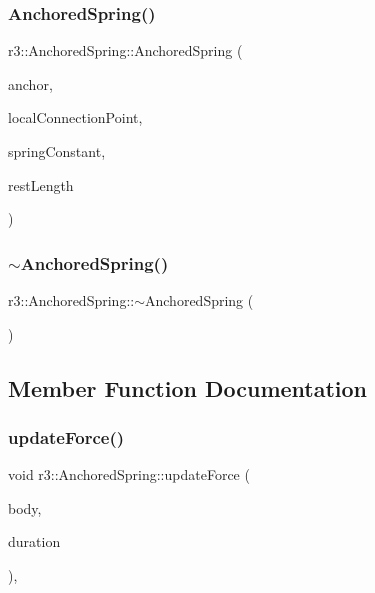 \subsubsection{\texorpdfstring{Anchored\+Spring()}{AnchoredSpring()}}
{\footnotesize\ttfamily r3\+::\+Anchored\+Spring\+::\+Anchored\+Spring (\begin{DoxyParamCaption}\item[{const glm\+::vec3 \&}]{anchor,  }\item[{const glm\+::vec3 \&}]{local\+Connection\+Point,  }\item[{\mbox{\hyperlink{namespacer3_ab2016b3e3f743fb735afce242f0dc1eb}{real}}}]{spring\+Constant,  }\item[{\mbox{\hyperlink{namespacer3_ab2016b3e3f743fb735afce242f0dc1eb}{real}}}]{rest\+Length }\end{DoxyParamCaption})\hspace{0.3cm}{\ttfamily [explicit]}}

\mbox{\label{classr3_1_1_anchored_spring_afe612722d8ed0d7a6f0058dcc21eb17f}} 
\subsubsection{\texorpdfstring{$\sim$\+Anchored\+Spring()}{~AnchoredSpring()}}
{\footnotesize\ttfamily r3\+::\+Anchored\+Spring\+::$\sim$\+Anchored\+Spring (\begin{DoxyParamCaption}{ }\end{DoxyParamCaption})\hspace{0.3cm}{\ttfamily [default]}}



\subsection{Member Function Documentation}
\mbox{\label{classr3_1_1_anchored_spring_a3e928bc7fdedc8eb5b302a007200a58c}} 
\subsubsection{\texorpdfstring{update\+Force()}{updateForce()}}
{\footnotesize\ttfamily void r3\+::\+Anchored\+Spring\+::update\+Force (\begin{DoxyParamCaption}\item[{\mbox{\hyperlink{classr3_1_1_rigid_body}{Rigid\+Body}} $\ast$}]{body,  }\item[{\mbox{\hyperlink{namespacer3_ab2016b3e3f743fb735afce242f0dc1eb}{real}}}]{duration }\end{DoxyParamCaption})\hspace{0.3cm}{\ttfamily [override]}, {\ttfamily [virtual]}}



